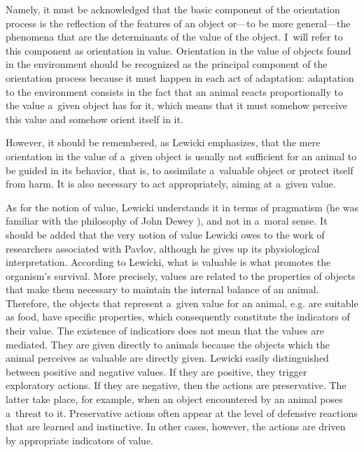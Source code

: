 Namely, it must be acknowledged that the basic component of the orientation process is the reflection of the features of an object or---to be more general---the phenomena that are the determinants of the value of the object. I~will refer to this component as orientation in value. Orientation in the value of objects found in the environment should be recognized as the principal component of the orientation process because it must happen in each act of adaptation: adaptation to the environment consists in the fact that an animal reacts proportionally to the value a~given object has for it, which means that it must somehow perceive this value and somehow orient itself in it. 
\parencite[][p.48]{lewicki_cognition_2016}%




However, it should be remembered, as Lewicki emphasizes, that the mere orientation in the value of a~given object is usually not sufficient for an animal to be guided in its behavior, that is, to assimilate a~valuable object or protect itself from harm. It is also necessary to act appropriately, aiming at a~given value.



As for the notion of value, Lewicki understands it in terms of pragmatism (he was familiar with the philosophy of John Dewey 
\parencite[cf.][p.234]{lewicki_procesy_1960}%
), and not in a~moral sense. It should be added that the very notion of value Lewicki owes to the work of researchers associated with Pavlov, although he gives up its physiological interpretation. According to Lewicki, what is valuable is what promotes the organism's survival. More precisely, values are related to the properties of objects that make them necessary to maintain the internal balance of an animal. Therefore, the objects that represent a~given value for an animal, e.g. are suitable as food, have specific properties, which consequently constitute the indicators of their value. The existence of indicatiors does not mean that the values are mediated. They are given directly to animals because the objects which the animal perceives as valuable are directly given. Lewicki easily distinguished between positive and negative values. If they are positive, they trigger exploratory actions. If they are negative, then the actions are preservative. The latter take place, for example, when an object encountered by an animal poses a~threat to it. Preservative actions often appear at the level of defensive reactions that are learned and instinctive. In other cases, however, the actions are driven by appropriate indicators of value.



